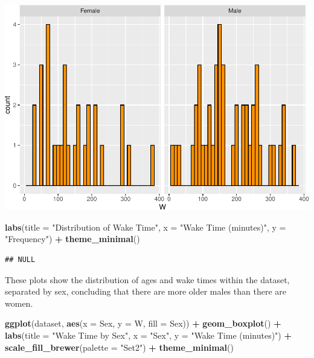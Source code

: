 \documentclass[
]{article}
\newenvironment{Shaded}{\begin{snugshade}}{\end{snugshade}}
\newcommand{\AttributeTok}[1]{\textcolor[rgb]{0.13,0.29,0.53}{#1}}
\newcommand{\FunctionTok}[1]{\textcolor[rgb]{0.13,0.29,0.53}{\textbf{#1}}}
\newcommand{\NormalTok}[1]{#1}
\newcommand{\SpecialCharTok}[1]{\textcolor[rgb]{0.81,0.36,0.00}{\textbf{#1}}}
\newcommand{\StringTok}[1]{\textcolor[rgb]{0.31,0.60,0.02}{#1}}
\begin{document}
\includegraphics{602_project_files/figure-latex/unnamed-chunk-15-2.pdf}

\begin{Shaded}
\begin{Highlighting}[]
\FunctionTok{labs}\NormalTok{(}\AttributeTok{title =} \StringTok{"Distribution of Wake Time"}\NormalTok{, }\AttributeTok{x =} \StringTok{"Wake Time (minutes)"}\NormalTok{,}
    \AttributeTok{y =} \StringTok{"Frequency"}\NormalTok{) }\SpecialCharTok{+} \FunctionTok{theme\_minimal}\NormalTok{()}
\end{Highlighting}
\end{Shaded}

\begin{verbatim}
## NULL
\end{verbatim}

These plots show the distribution of ages and wake times within the
dataset, separated by sex, concluding that there are more older males
than there are women.

\begin{Shaded}
\begin{Highlighting}[]
\FunctionTok{ggplot}\NormalTok{(dataset, }\FunctionTok{aes}\NormalTok{(}\AttributeTok{x =}\NormalTok{ Sex, }\AttributeTok{y =}\NormalTok{ W, }\AttributeTok{fill =}\NormalTok{ Sex)) }\SpecialCharTok{+} \FunctionTok{geom\_boxplot}\NormalTok{() }\SpecialCharTok{+}
    \FunctionTok{labs}\NormalTok{(}\AttributeTok{title =} \StringTok{"Wake Time by Sex"}\NormalTok{, }\AttributeTok{x =} \StringTok{"Sex"}\NormalTok{, }\AttributeTok{y =} \StringTok{"Wake Time (minutes)"}\NormalTok{) }\SpecialCharTok{+}
    \FunctionTok{scale\_fill\_brewer}\NormalTok{(}\AttributeTok{palette =} \StringTok{"Set2"}\NormalTok{) }\SpecialCharTok{+} \FunctionTok{theme\_minimal}\NormalTok{()}
\end{Highlighting}
\end{Shaded}
\end{document}
